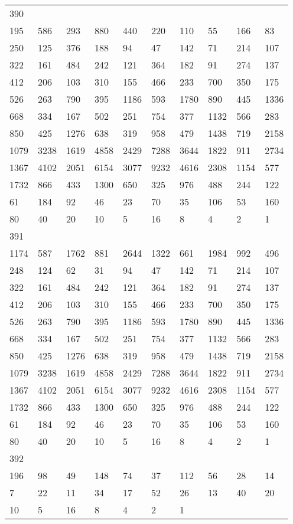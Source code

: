 \begin{longtable}{*{10}{l}}
390&&&&&&&&&\\
195& 586& 293& 880& 440& 220& 110& 55& 166& 83\\
250& 125& 376& 188& 94& 47& 142& 71& 214& 107\\
322& 161& 484& 242& 121& 364& 182& 91& 274& 137\\
412& 206& 103& 310& 155& 466& 233& 700& 350& 175\\
526& 263& 790& 395& 1186& 593& 1780& 890& 445& 1336\\
668& 334& 167& 502& 251& 754& 377& 1132& 566& 283\\
850& 425& 1276& 638& 319& 958& 479& 1438& 719& 2158\\
1079& 3238& 1619& 4858& 2429& 7288& 3644& 1822& 911& 2734\\
1367& 4102& 2051& 6154& 3077& 9232& 4616& 2308& 1154& 577\\
1732& 866& 433& 1300& 650& 325& 976& 488& 244& 122\\
61& 184& 92& 46& 23& 70& 35& 106& 53& 160\\
80& 40& 20& 10& 5& 16& 8& 4& 2& 1\\

391&&&&&&&&&\\
1174& 587& 1762& 881& 2644& 1322& 661& 1984& 992& 496\\
248& 124& 62& 31& 94& 47& 142& 71& 214& 107\\
322& 161& 484& 242& 121& 364& 182& 91& 274& 137\\
412& 206& 103& 310& 155& 466& 233& 700& 350& 175\\
526& 263& 790& 395& 1186& 593& 1780& 890& 445& 1336\\
668& 334& 167& 502& 251& 754& 377& 1132& 566& 283\\
850& 425& 1276& 638& 319& 958& 479& 1438& 719& 2158\\
1079& 3238& 1619& 4858& 2429& 7288& 3644& 1822& 911& 2734\\
1367& 4102& 2051& 6154& 3077& 9232& 4616& 2308& 1154& 577\\
1732& 866& 433& 1300& 650& 325& 976& 488& 244& 122\\
61& 184& 92& 46& 23& 70& 35& 106& 53& 160\\
80& 40& 20& 10& 5& 16& 8& 4& 2& 1\\

392&&&&&&&&&\\
196& 98& 49& 148& 74& 37& 112& 56& 28& 14\\
7& 22& 11& 34& 17& 52& 26& 13& 40& 20\\
10& 5& 16& 8& 4& 2& 1& \\


\end{longtable}
